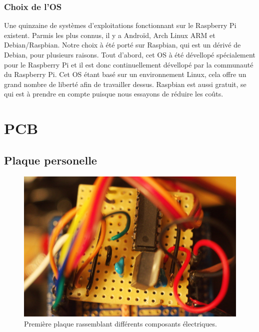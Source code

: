 \documentclass[a4paper,12pt]{report}
\begin{document}
{\subsubsection{Choix de l'OS}
Une quinzaine de systèmes d'exploitations fonctionnant sur le Raspberry Pi existent. Parmis les plus connus, il y a Androïd, Arch Linux ARM et Debian/Raspbian. 
Notre choix à été porté sur Raspbian, qui est un dérivé de Debian, pour plusieurs raisons. Tout d'abord, cet OS à été dévellopé spécialement pour le Raspberry Pi et il est donc continuellement dévellopé par la communauté du Raspberry Pi. Cet OS étant basé sur un environnement Linux, cela offre un grand nombre de liberté afin de travailler dessus. Raspbian est aussi gratuit, se qui est à prendre en compte puisque nous essayons de réduire les coûts.  


\section{PCB}

\subsection{Plaque personelle}
\begin{figure}[h]
\centering
\includegraphics[width=1.0\textwidth]{figures/DSC_1116res}
    \caption{\label{PPFigure}Première plaque rassemblant différents composants électriques. 
    }
\end{figure}

}
\end{document}

